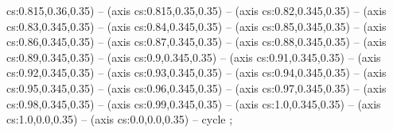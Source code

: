 cs:0.815,0.36,0.35) -- (axis cs:0.815,0.35,0.35) -- (axis cs:0.82,0.345,0.35) -- (axis cs:0.83,0.345,0.35) -- (axis cs:0.84,0.345,0.35) -- (axis cs:0.85,0.345,0.35) -- (axis cs:0.86,0.345,0.35) -- (axis cs:0.87,0.345,0.35) -- (axis cs:0.88,0.345,0.35) -- (axis cs:0.89,0.345,0.35) -- (axis cs:0.9,0.345,0.35) -- (axis cs:0.91,0.345,0.35) -- (axis cs:0.92,0.345,0.35) -- (axis cs:0.93,0.345,0.35) -- (axis cs:0.94,0.345,0.35) -- (axis cs:0.95,0.345,0.35) -- (axis cs:0.96,0.345,0.35) -- (axis cs:0.97,0.345,0.35) -- (axis cs:0.98,0.345,0.35) -- (axis cs:0.99,0.345,0.35) -- (axis cs:1.0,0.345,0.35) -- (axis cs:1.0,0.0,0.35) -- (axis cs:0.0,0.0,0.35) -- cycle
;
